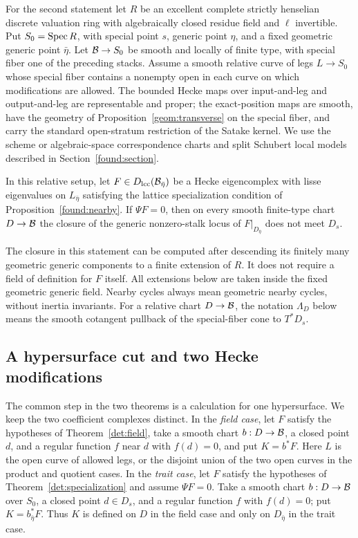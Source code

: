 For the second statement let $R$ be an excellent complete strictly
henselian discrete valuation ring with algebraically closed residue field
and $\ell$ invertible. Put $S_0=\operatorname{Spec} R$, with special point $s$, generic
point $\eta$, and a fixed geometric generic point $\bar\eta$.
Let $\mathcal B\to S_0$ be smooth and locally of finite type, with special
fiber one of the preceding stacks. Assume a smooth relative curve of
legs $L\to S_0$ whose special fiber contains a nonempty open in each
curve on which modifications are allowed. The bounded Hecke maps over
input-and-leg and output-and-leg are representable and proper; the
exact-position maps are smooth, have the geometry of
Proposition~\ref{geom:transverse} on the special fiber, and carry the
standard open-stratum restriction of the Satake kernel. We use the
scheme or algebraic-space correspondence charts and split Schubert local
models described in Section~\ref{found:section}.

\begin{theorem}\label{det:specialization}
In this relative setup, let $F\in D_{\mathrm{lcc}}(\mathcal B_{\bar\eta})$ be a Hecke
eigencomplex with lisse eigenvalues on $L_{\bar\eta}$ satisfying the
lattice specialization condition of Proposition~\ref{found:nearby}.
If $\Psi F=0$, then on every smooth finite-type chart $D\to\mathcal B$
the closure of the generic nonzero-stalk locus of $F|_{D_{\bar\eta}}$
does not meet $D_s$.
\end{theorem}

The closure in this statement can be computed after descending its finitely
many geometric generic components to a finite extension of $R$.  It does
not require a field of definition for $F$ itself.  All extensions below are
taken inside the fixed geometric generic field.  Nearby cycles always mean
geometric nearby cycles, without inertia invariants. For a relative chart
$D\to\mathcal B$, the notation $\Lambda_D$ below means the smooth cotangent
pullback of the special-fiber cone to $T^*D_s$.

\subsection{A hypersurface cut and two Hecke modifications}

The common step in the two theorems is a calculation for one hypersurface.
We keep the two coefficient complexes distinct.  In the \emph{field case},
let $F$ satisfy the hypotheses of Theorem~\ref{det:field},
take a smooth chart $b:D\to\mathcal B$, a closed point $d$, and a regular function
$f$ near $d$ with $f(d)=0$, and put $K=b^*F$.
Here $L$ is the open curve of allowed legs, or the disjoint union of
the two open curves in the product and quotient cases.  In the \emph{trait case}, let $F$
satisfy the hypotheses of Theorem~\ref{det:specialization}
and assume $\Psi F=0$.  Take a smooth chart $b:D\to\mathcal B$ over $S_0$,
a closed point $d\in D_s$, and a regular function $f$ with $f(d)=0$;
put $K=b_{\bar\eta}^*F$.  Thus $K$ is defined on $D$ in the field case
and only on $D_{\bar\eta}$ in the trait case.

